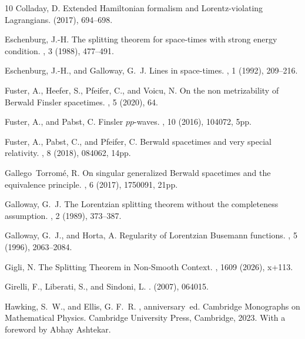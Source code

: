 \documentclass[a4paper,11pt]{article}
\numberwithin{equation}{section}
\theoremstyle{definition}
\theoremstyle{plain}
\begin{document}
\begin{thebibliography}{10}
	{\sc Colladay, D.}
	\newblock Extended {H}amiltonian formalism and {L}orentz-violating
	{L}agrangians.
	 (2017), 694--698.
	
	{\sc Eschenburg, J.-H.}
	\newblock The splitting theorem for space-times with strong energy condition.
	, 3 (1988), 477--491.
	
	{\sc Eschenburg, J.-H., and Galloway, G.~J.}
	\newblock Lines in space-times.
	, 1 (1992), 209--216.
	
	{\sc Fuster, A., Heefer, S., Pfeifer, C., and Voicu, N.}
	\newblock On the non metrizability of {Berwald} {Finsler} spacetimes.
	, 5 (2020), 64.
	
	{\sc Fuster, A., and Pabst, C.}
	\newblock Finsler {$pp$}-waves.
	, 10 (2016), 104072, 5pp.
	
	{\sc Fuster, A., Pabst, C., and Pfeifer, C.}
	\newblock Berwald spacetimes and very special relativity.
	, 8 (2018), 084062, 14pp.
	
	{\sc Gallego~Torrom\'e, R.}
	\newblock On singular generalized {B}erwald spacetimes and the equivalence
	principle.
	, 6 (2017), 1750091, 21pp.
	
	{\sc Galloway, G.~J.}
	\newblock The {L}orentzian splitting theorem without the completeness
	assumption.
	, 2 (1989), 373--387.
	
	{\sc Galloway, G.~J., and Horta, A.}
	\newblock Regularity of {L}orentzian {B}usemann functions.
	, 5 (1996), 2063--2084.
	
	{\sc Gigli, N.}
	\newblock The {S}plitting {T}heorem in {N}on-{S}mooth {C}ontext.
	, 1609 (2026), x+113.
	
	{\sc Girelli, F., Liberati, S., and Sindoni, L.}
	.
	 (2007), 064015.
	
	{\sc Hawking, S.~W., and Ellis, G. F.~R.}
	, anniversary~ed.
	\newblock Cambridge Monographs on Mathematical Physics. Cambridge University
	Press, Cambridge, 2023.
	\newblock With a foreword by Abhay Ashtekar.
	

\end{thebibliography}
\end{document}
